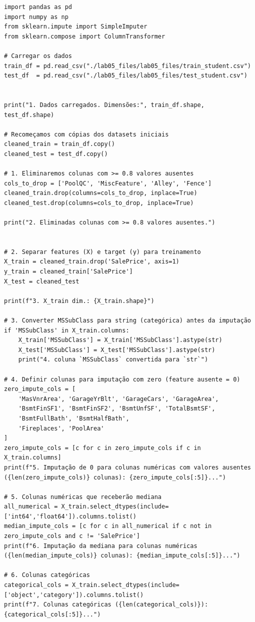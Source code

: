 \documentclass[11pt]{article}
\begin{document}
\begin{verbatim}
import pandas as pd
import numpy as np
from sklearn.impute import SimpleImputer
from sklearn.compose import ColumnTransformer

# Carregar os dados
train_df = pd.read_csv("./lab05_files/lab05_files/train_student.csv")
test_df  = pd.read_csv("./lab05_files/lab05_files/test_student.csv")


print("1. Dados carregados. Dimensões:", train_df.shape, test_df.shape)

# Recomeçamos com cópias dos datasets iniciais
cleaned_train = train_df.copy()
cleaned_test = test_df.copy()

# 1. Eliminaremos colunas com >= 0.8 valores ausentes
cols_to_drop = ['PoolQC', 'MiscFeature', 'Alley', 'Fence']
cleaned_train.drop(columns=cols_to_drop, inplace=True)
cleaned_test.drop(columns=cols_to_drop, inplace=True)

print("2. Eliminadas colunas com >= 0.8 valores ausentes.")


# 2. Separar features (X) e target (y) para treinamento
X_train = cleaned_train.drop('SalePrice', axis=1)
y_train = cleaned_train['SalePrice']
X_test = cleaned_test

print(f"3. X_train dim.: {X_train.shape}")

# 3. Converter MSSubClass para string (categórica) antes da imputação
if 'MSSubClass' in X_train.columns:
    X_train['MSSubClass'] = X_train['MSSubClass'].astype(str)
    X_test['MSSubClass'] = X_test['MSSubClass'].astype(str)
    print("4. coluna `MSSubClass` convertida para `str`")

# 4. Definir colunas para imputação com zero (feature ausente = 0)
zero_impute_cols = [
    'MasVnrArea', 'GarageYrBlt', 'GarageCars', 'GarageArea',
    'BsmtFinSF1', 'BsmtFinSF2', 'BsmtUnfSF', 'TotalBsmtSF',
    'BsmtFullBath', 'BsmtHalfBath',
    'Fireplaces', 'PoolArea'
]
zero_impute_cols = [c for c in zero_impute_cols if c in X_train.columns]
print(f"5. Imputação de 0 para colunas numéricas com valores ausentes  ({len(zero_impute_cols)} colunas): {zero_impute_cols[:5]}...")

# 5. Colunas numéricas que receberão mediana
all_numerical = X_train.select_dtypes(include=['int64','float64']).columns.tolist()
median_impute_cols = [c for c in all_numerical if c not in zero_impute_cols and c != 'SalePrice']
print(f"6. Imputação da mediana para colunas numéricas ({len(median_impute_cols)} colunas): {median_impute_cols[:5]}...")

# 6. Colunas categóricas
categorical_cols = X_train.select_dtypes(include=['object','category']).columns.tolist()
print(f"7. Colunas categóricas ({len(categorical_cols)}): {categorical_cols[:5]}...")


\end{verbatim}
\end{document}
